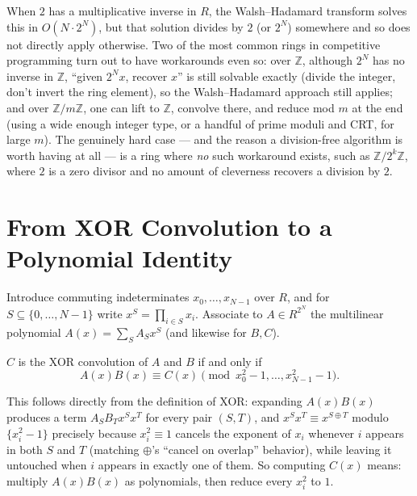 \documentclass[11pt]{article}
\begin{document}
\begin{notebox}
When $2$ has a multiplicative inverse in $R$, the Walsh--Hadamard
transform solves this in $O(N\cdot2^N)$, but that solution divides by
$2$ (or $2^N$) somewhere and so does not directly apply otherwise. Two
of the most common rings in competitive programming turn out to have
workarounds even so: over $\mathbb{Z}$, although $2^N$ has no inverse in
$\mathbb{Z}$, ``given $2^Nx$, recover $x$'' is still solvable exactly
(divide the integer, don't invert the ring element), so the
Walsh--Hadamard approach still applies; and over $\mathbb{Z}/m\mathbb{Z}$,
one can lift to $\mathbb{Z}$, convolve there, and reduce mod $m$ at the
end (using a wide enough integer type, or a handful of prime moduli and
CRT, for large $m$). The genuinely hard case --- and the reason a
division-free algorithm is worth having at all --- is a ring where
\emph{no} such workaround exists, such as $\mathbb{Z}/2^k\mathbb{Z}$,
where $2$ is a zero divisor and no amount of cleverness recovers a
division by $2$.
\end{notebox}

\section{From XOR Convolution to a Polynomial Identity}
Introduce commuting indeterminates $x_0,\ldots,x_{N-1}$ over $R$, and
for $S\subseteq\{0,\ldots,N-1\}$ write $x^S = \prod_{i\in S}x_i$.
Associate to $A\in R^{2^N}$ the multilinear polynomial
$A(x) = \sum_S A_Sx^S$ (and likewise for $B,C$).

\begin{theorembox}
$C$ is the XOR convolution of $A$ and $B$ if and only if
\[
  A(x)B(x) \equiv C(x) \pmod{x_0^2-1,\ldots,x_{N-1}^2-1}.
\]
\end{theorembox}
This follows directly from the definition of XOR: expanding $A(x)B(x)$
produces a term $A_SB_Tx^{S}x^{T}$ for every pair $(S,T)$, and
$x^Sx^T \equiv x^{S\oplus T}$ modulo $\{x_i^2-1\}$ precisely because
$x_i^2\equiv 1$ cancels the exponent of $x_i$ whenever $i$ appears in
both $S$ and $T$ (matching $\oplus$'s ``cancel on overlap'' behavior),
while leaving it untouched when $i$ appears in exactly one of them. So
computing $C(x)$ means: multiply $A(x)B(x)$ as polynomials, then reduce
every $x_i^2$ to $1$.
\end{document}
